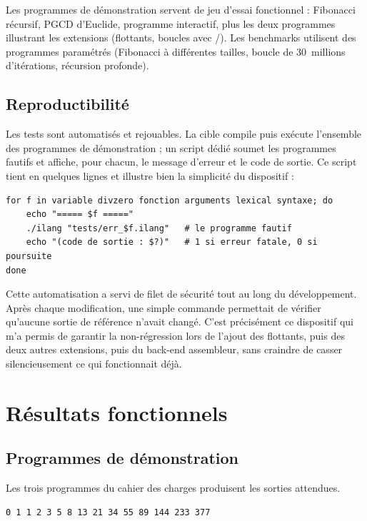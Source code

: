 Les programmes de démonstration servent de jeu d'essai fonctionnel : Fibonacci
récursif, PGCD d'Euclide, programme interactif, plus les deux programmes
illustrant les extensions (flottants, boucles avec /).
Les benchmarks utilisent des programmes paramétrés (Fibonacci à différentes
tailles, boucle de 30~millions d'itérations, récursion profonde).

\subsection{Reproductibilité}

Les tests sont automatisés et rejouables. La cible  compile puis
exécute l'ensemble des programmes de démonstration ; un script dédié soumet les
programmes fautifs et affiche, pour chacun, le message d'erreur et le code de
sortie. Ce script tient en quelques lignes et illustre bien la simplicité du
dispositif :

\begin{lstlisting}[style=gram,caption={C\oe ur du script de test des erreurs.}]
for f in variable divzero fonction arguments lexical syntaxe; do
    echo "===== $f ====="
    ./ilang "tests/err_$f.ilang"   # le programme fautif
    echo "(code de sortie : $?)"   # 1 si erreur fatale, 0 si poursuite
done
\end{lstlisting}

Cette automatisation a servi de filet de sécurité tout au long du développement.
Après chaque modification, une simple commande permettait de vérifier qu'aucune
sortie de référence n'avait changé. C'est précisément ce dispositif qui m'a permis
de garantir la non-régression lors de l'ajout des flottants, puis des deux autres
extensions, puis du back-end assembleur, sans craindre de casser silencieusement
ce qui fonctionnait déjà.

\section{Résultats fonctionnels}

\subsection{Programmes de démonstration}

Les trois programmes du cahier des charges produisent les sorties attendues.

\begin{lstlisting}[style=ilang,caption={Sortie de \code{fibonacci.ilang} (15 premiers termes).}]
0 1 1 2 3 5 8 13 21 34 55 89 144 233 377
\end{lstlisting}

